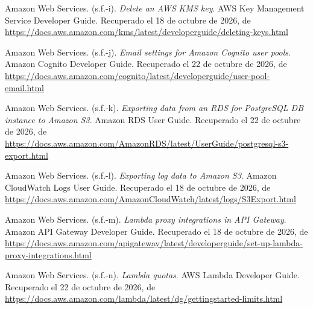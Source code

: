 \documentclass[12pt, a4paper]{article}
\begin{document}
\begin{list}{}{\setlength{\leftmargin}{1.27cm}\setlength{\itemindent}{-1.27cm}%
  \setlength{\labelwidth}{0pt}\setlength{\labelsep}{0pt}\setlength{\itemsep}{6pt}}
\item Amazon Web Services. (s.f.-i). \textit{Delete an AWS KMS key}.
  AWS Key Management Service Developer Guide. Recuperado el 18 de octubre de 2026, de \url{https://docs.aws.amazon.com/kms/latest/developerguide/deleting-keys.html}
 
 
\item Amazon Web Services. (s.f.-j). \textit{Email settings for Amazon
  Cognito user pools}. Amazon Cognito Developer Guide. Recuperado el 22 de octubre de 2026, de \url{https://docs.aws.amazon.com/cognito/latest/developerguide/user-pool-email.html}
 
 
\item Amazon Web Services. (s.f.-k). \textit{Exporting data from an RDS
  for PostgreSQL DB instance to Amazon S3}. Amazon RDS User Guide. Recuperado el 22 de octubre de 2026, de \url{https://docs.aws.amazon.com/AmazonRDS/latest/UserGuide/postgresql-s3-export.html}
 
 
\item Amazon Web Services. (s.f.-l). \textit{Exporting log data to
  Amazon S3}. Amazon CloudWatch Logs User Guide. Recuperado el 18 de octubre de 2026, de \url{https://docs.aws.amazon.com/AmazonCloudWatch/latest/logs/S3Export.html}

 
\item Amazon Web Services. (s.f.-m). \textit{Lambda proxy integrations
  in API Gateway}. Amazon API Gateway Developer Guide. Recuperado el 18 de octubre de 2026, de \url{https://docs.aws.amazon.com/apigateway/latest/developerguide/set-up-lambda-proxy-integrations.html}
 
 
\item Amazon Web Services. (s.f.-n). \textit{Lambda quotas}. AWS Lambda
  Developer Guide. Recuperado el 22 de octubre de 2026, de \url{https://docs.aws.amazon.com/lambda/latest/dg/gettingstarted-limits.html}
 

\end{list}
\end{document}
